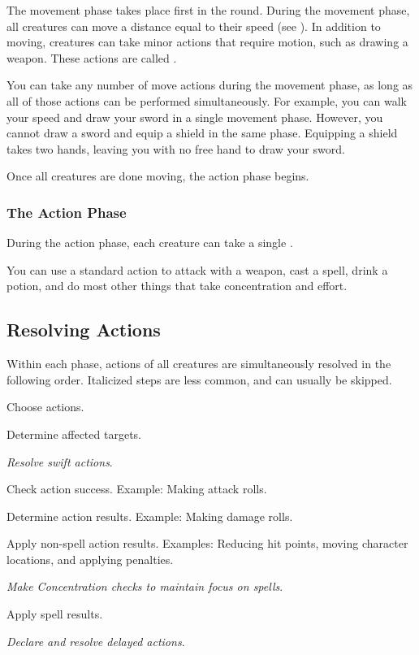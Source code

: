             The movement phase takes place first in the round.
            During the movement phase, all creatures can move a distance equal to their speed (see ).
            In addition to moving, creatures can take minor actions that require motion, such as drawing a weapon.
            These actions are called .

            You can take any number of move actions during the movement phase, as long as all of those actions can be performed simultaneously.
            For example, you can walk your speed and draw your sword in a single movement phase.
            However, you cannot draw a sword and equip a shield in the same phase.
            Equipping a shield takes two hands, leaving you with no free hand to draw your sword.

            Once all creatures are done moving, the action phase begins.

        \subsubsection{The Action Phase}\label{The Action Phase}

            During the action phase, each creature can take a single .

             You can use a standard action to attack with a weapon, cast a spell, drink a potion, and do most other things that take concentration and effort.

    \subsection{Resolving Actions}\label{Resolving Actions}

        Within each phase, actions of all creatures are simultaneously resolved in the following order.
        Italicized steps are less common, and can usually be skipped.

        \begin{enumerate*}
            \item Choose actions.
            \item Determine affected targets.
            \item \textit{Resolve swift actions}.
            \item Check action success.
                Example: Making attack rolls.
            \item Determine action results.
                Example: Making damage rolls.
            \item Apply non-spell action results.
                Examples: Reducing hit points, moving character locations, and applying penalties.
            \item \textit{Make Concentration checks to maintain focus on spells}.
            \item Apply spell results.
            \item \textit{Declare and resolve delayed actions}.
        \end{enumerate*}

